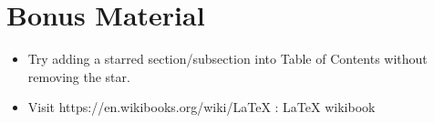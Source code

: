 \documentclass{article}
\begin{document}
\section*{Bonus Material}

\begin{itemize}
	\item Try adding a starred section/subsection into Table of Contents without removing the star.
	\item Visit https://en.wikibooks.org/wiki/LaTeX : \LaTeX{} wikibook
\end{itemize}


%
%
\end{document}
